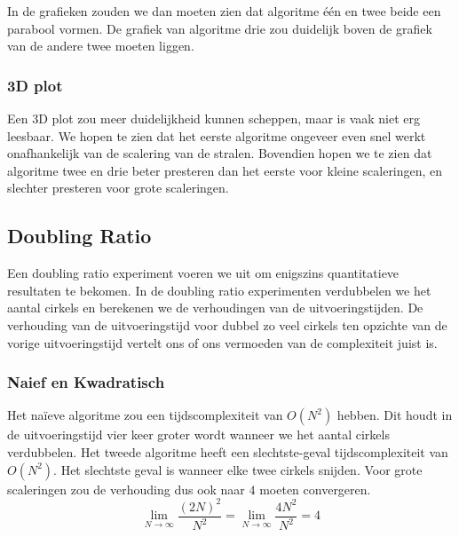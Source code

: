 In de grafieken zouden we dan moeten zien dat algoritme \'e\'en en twee beide een parabool vormen. De grafiek van algoritme drie zou duidelijk boven de grafiek van de andere twee moeten liggen.

\subsubsection{3D plot}
Een 3D plot zou meer duidelijkheid kunnen scheppen, maar is vaak niet erg leesbaar. We hopen te zien dat het eerste algoritme ongeveer even snel werkt onafhankelijk van de scalering van de stralen. Bovendien hopen we te zien dat algoritme twee en drie beter presteren dan het eerste voor kleine scaleringen, en slechter presteren voor grote scaleringen.


\subsection{Doubling Ratio}
Een doubling ratio experiment voeren we uit om enigszins quantitatieve resultaten te bekomen. In de doubling ratio experimenten verdubbelen we het aantal cirkels en berekenen we de verhoudingen van de uitvoeringstijden. De verhouding van de uitvoeringstijd voor dubbel zo veel cirkels ten opzichte van de vorige uitvoeringstijd vertelt ons of ons vermoeden van de complexiteit juist is.

\subsubsection{Naief en Kwadratisch}
Het na\"ieve algoritme zou een tijdscomplexiteit van $O(N^2)$ hebben. Dit houdt in de uitvoeringstijd vier keer groter wordt wanneer we het aantal cirkels verdubbelen.
Het tweede algoritme heeft een slechtste-geval tijdscomplexiteit van $O(N^2)$. Het slechtste geval is wanneer elke twee cirkels snijden. Voor grote scaleringen zou de verhouding dus ook naar $4$ moeten convergeren.
\[
\lim_{N\rightarrow\infty}\frac{(2N)^2}{N^2}
= \lim_{N\rightarrow\infty}\frac{4N^2}{N^2}
= 4
\]

